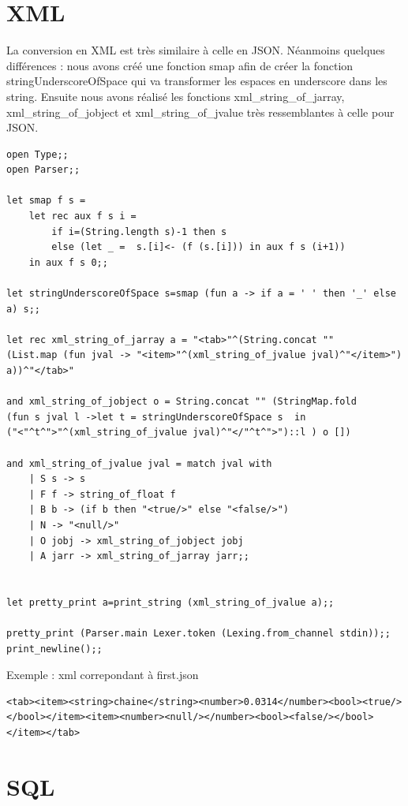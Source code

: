 \documentclass{report}
\begin{document}
\section{XML}
\par
La conversion en XML est très similaire à celle en JSON. Néanmoins quelques différences : nous avons créé une fonction smap afin de créer la fonction stringUnderscoreOfSpace qui va transformer les espaces en underscore dans les string. Ensuite nous avons réalisé les fonctions xml\_string\_of\_jarray, xml\_string\_of\_jobject et xml\_string\_of\_jvalue très ressemblantes à celle pour JSON.
\\
\begin{verbatim}
open Type;;
open Parser;;

let smap f s = 
	let rec aux f s i =
		if i=(String.length s)-1 then s
		else (let _ =  s.[i]<- (f (s.[i])) in aux f s (i+1))
	in aux f s 0;;
	
let stringUnderscoreOfSpace s=smap (fun a -> if a = ' ' then '_' else a) s;;

let rec xml_string_of_jarray a = "<tab>"^(String.concat "" 
(List.map (fun jval -> "<item>"^(xml_string_of_jvalue jval)^"</item>") a))^"</tab>"
	
and xml_string_of_jobject o = String.concat "" (StringMap.fold 
(fun s jval l ->let t = stringUnderscoreOfSpace s  in  
("<"^t^">"^(xml_string_of_jvalue jval)^"</"^t^">")::l ) o [])
	
and xml_string_of_jvalue jval = match jval with
	| S s -> s
	| F f -> string_of_float f
	| B b -> (if b then "<true/>" else "<false/>")
	| N -> "<null/>"
	| O jobj -> xml_string_of_jobject jobj
	| A jarr -> xml_string_of_jarray jarr;;
	
	
let pretty_print a=print_string (xml_string_of_jvalue a);;

pretty_print (Parser.main Lexer.token (Lexing.from_channel stdin));;
print_newline();;
\end{verbatim}

Exemple : xml correpondant à first.json
\\
\begin{verbatim}
<tab><item><string>chaine</string><number>0.0314</number><bool><true/>
</bool></item><item><number><null/></number><bool><false/></bool></item></tab>
\end{verbatim}

\section{SQL}
\end{document}
